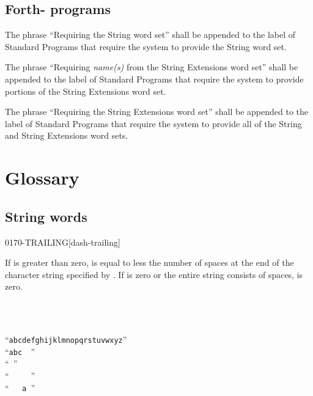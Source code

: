 \subsection{Forth-\snapshot{} programs} %

The phrase ``Requiring the String word set'' shall be appended to
the label of Standard Programs that require the system to provide
the String word set.

The phrase ``Requiring \emph{name(s)} from the String Extensions
word set'' shall be appended to the label of Standard Programs that
require the system to provide portions of the String Extensions
word set.

The phrase ``Requiring the String Extensions word set'' shall be
appended to the label of Standard Programs that require the system
to provide all of the String and String Extensions word sets.


\section{Glossary} %

\subsection{String words} %


\begin{worddef}{0170}{-TRAILING}[dash-trailing]
\item {}

	If  is greater than zero,  is equal to
	 less the number of spaces at the end of the
	character string specified by . If 
	is zero or the entire string consists of spaces,  is
	zero.

	\begin{testing} %
		 \\
		 \\

				\tab {} ``\texttt{abcdefghijklmnopqrstuvwxyz}'' \\
		 			\tab[2.5]  ``\texttt{abc~~}'' \\
							\tab[5.2]  ``\texttt{~}'' \\
			\tab[1]  ``\texttt{~~~~~}'' \\
						\tab[2.8]  ``\texttt{~~~a~}''
	\end{testing}
\end{worddef}


